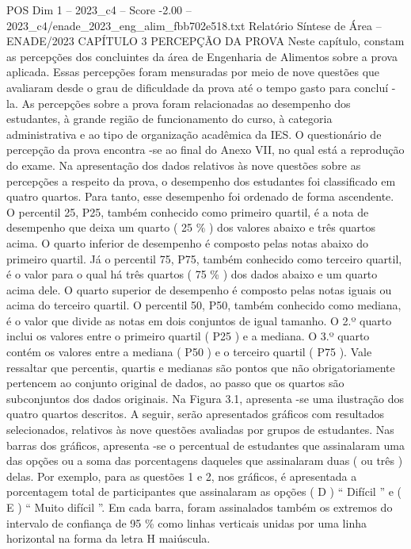 \begin{textsample}{POS Dim 1 – 2023\_c4 – Score -2.00 – 2023\_c4/enade\_2023\_eng\_alim\_fbb702e518.txt}  \label{ex:f1_pos_196}
Relatório Síntese de Área – ENADE/2023 CAPÍTULO 3 PERCEPÇÃO DA PROVA Neste capítulo, constam as percepções dos concluintes da área de Engenharia de Alimentos sobre a prova aplicada.
Essas percepções foram mensuradas por meio de nove questões que avaliaram desde o grau de dificuldade da prova até o tempo gasto para concluí -la.
As percepções sobre a prova foram relacionadas ao desempenho dos estudantes, à grande região de funcionamento do curso, à categoria administrativa e ao tipo de organização acadêmica da IES.
O questionário de percepção da prova encontra -se ao final do Anexo VII, no qual está a reprodução do exame.
Na apresentação dos dados relativos às nove questões sobre as percepções a respeito da prova, o desempenho dos estudantes foi classificado em quatro quartos.
Para tanto, esse desempenho foi ordenado de forma ascendente.
O percentil 25, P25, também conhecido como primeiro quartil, é a nota de desempenho que deixa um quarto ( 25 \% ) dos valores abaixo e três quartos acima.
O quarto inferior de desempenho é composto pelas notas abaixo do primeiro quartil.
Já o percentil 75, P75, também conhecido como terceiro quartil, é o valor para o qual há três quartos ( 75 \% ) dos dados abaixo e um quarto acima dele.
O quarto superior de desempenho é composto pelas notas iguais ou acima do terceiro quartil.
O percentil 50, P50, também conhecido como mediana, é o valor que divide as notas em dois conjuntos de igual tamanho.
O 2.º quarto inclui os valores entre o primeiro quartil ( P25 ) e a mediana.
O 3.º quarto contém os valores entre a mediana ( P50 ) e o terceiro quartil ( P75 ).
Vale ressaltar que percentis, quartis e medianas são pontos que não obrigatoriamente pertencem ao conjunto original de dados, ao passo que os quartos são subconjuntos dos dados originais.
Na Figura 3.1, apresenta -se uma ilustração dos quatro quartos descritos.
A seguir, serão apresentados gráficos com resultados selecionados, relativos às nove questões avaliadas por grupos de estudantes.
Nas barras dos gráficos, apresenta -se o percentual de estudantes que assinalaram uma das opções ou a soma das porcentagens daqueles que assinalaram duas ( ou três ) delas.
Por exemplo, para as questões 1 e 2, nos gráficos, é apresentada a porcentagem total de participantes que assinalaram as opções ( D ) “ Difícil ” e ( E ) “ Muito difícil ”.
Em cada barra, foram assinalados também os extremos do intervalo de confiança de 95 \% como linhas verticais unidas por uma linha horizontal na forma da letra H maiúscula.

\end{textsample}
